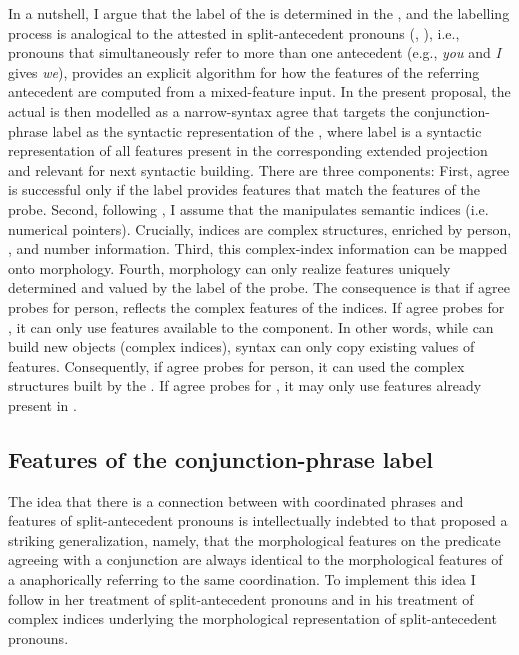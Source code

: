 \documentclass[output=paper,modfontsnewtxmath,hidelinks]{langscibook}
\begin{document}
In a nutshell, I argue that the label of the  is determined in the , and the labelling process is analogical to the  attested in split-antecedent pronouns (\citealt{Heim2008}, \citealt{Sudo2012}), i.e.,  pronouns that simultaneously refer to more than one antecedent (e.g., \textit{you} and \textit{I} gives \textit{we}), provides an explicit algorithm for how the features of the referring antecedent are computed from a mixed-feature input. In the present proposal, the actual  is then modelled as a narrow-syntax agree that targets the conjunction-phrase label as the syntactic representation of the , where label is a syntactic representation of all features present in the corresponding extended projection and relevant for next syntactic building. There are three components: First, agree is successful only if the label provides features that match the features of the probe. Second, following \citet{Sudo2012}, I assume that the  manipulates semantic indices (i.e. numerical pointers). Crucially, indices are complex structures, enriched by person, , and number information. Third,  this complex-index information can be mapped onto morphology. Fourth, morphology can only realize features uniquely determined and valued by the label of the probe. The consequence is that if agree probes for person,  reflects the complex features of the indices. If agree probes for , it can only use  features available to the  component. In other words, while  can build new objects (complex indices), syntax can only copy existing values of features. Consequently, if agree probes for person, it can used the complex structures built by the . If agree probes for , it may only use features already present in .

\subsection{Features of the conjunction-phrase label}

The idea that there is a connection between  with coordinated  phrases and features of split-antecedent pronouns is intellectually indebted to \citet{Farkas1995} that proposed a striking generalization, namely, that the morphological features on the predicate agreeing with a  conjunction are always identical to the morphological features of a  anaphorically referring to the same coordination. To implement this idea I follow \citet{Heim2008} in her treatment of split-antecedent pronouns and \citet{Sudo2012} in his treatment of complex indices underlying the morphological representation of split-antecedent pronouns. 
\end{document}

